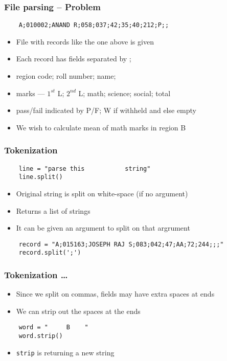 \begin{frame}[fragile]
  \frametitle{File parsing -- Problem}
  \begin{lstlisting}
    A;010002;ANAND R;058;037;42;35;40;212;P;;
  \end{lstlisting}
  \begin{itemize}
  \item File with records like the one above is given
  \item Each record has fields separated by ;
  \item region code; roll number; name; 
  \item marks --- $1^{st}$ L; $2^{nd}$ L; math; science; social; total
  \item pass/fail indicated by P/F; W if withheld and else empty
    \end{itemize}

  \begin{itemize}
  \item We wish to calculate mean of math marks in region B
  \end{itemize}
\end{frame}

\begin{frame}[fragile]
  \frametitle{Tokenization}
  \begin{lstlisting}
    line = "parse this           string"
    line.split()
  \end{lstlisting}
  \begin{itemize}
  \item Original string is split on white-space (if no argument)
  \item Returns a list of strings
  \item It can be given an argument to split on that argrument
  \end{itemize}
  \begin{lstlisting}
    record = "A;015163;JOSEPH RAJ S;083;042;47;AA;72;244;;;"
    record.split(';')
  \end{lstlisting}
\end{frame}

\begin{frame}[fragile]
  \frametitle{Tokenization \ldots}
  \begin{itemize}
  \item Since we split on commas, fields may have extra spaces at ends
  \item We can strip out the spaces at the ends
  \end{itemize}
  \begin{lstlisting}
    word = "     B    "
    word.strip()
  \end{lstlisting}
  \begin{itemize}
  \item \texttt{strip} is returning a new string 
  \end{itemize}
\end{frame}

